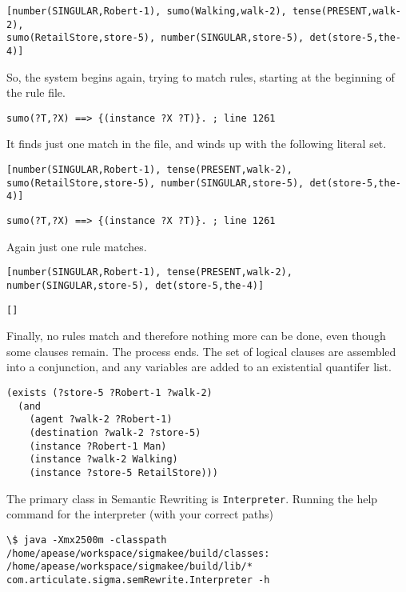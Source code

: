 \documentclass{book}
\begin{document}
\begin{verbatim}
[number(SINGULAR,Robert-1), sumo(Walking,walk-2), tense(PRESENT,walk-2), 
sumo(RetailStore,store-5), number(SINGULAR,store-5), det(store-5,the-4)]
\end{verbatim}

So, the system begins again, trying to match rules, starting at the 
beginning of the rule file.

\begin{verbatim}
sumo(?T,?X) ==> {(instance ?X ?T)}. ; line 1261
\end{verbatim}

It finds just one match in the file, and winds up with the following
literal set.

\begin{verbatim}
[number(SINGULAR,Robert-1), tense(PRESENT,walk-2), 
sumo(RetailStore,store-5), number(SINGULAR,store-5), det(store-5,the-4)]
\end{verbatim}

\begin{verbatim}
sumo(?T,?X) ==> {(instance ?X ?T)}. ; line 1261
\end{verbatim}

Again just one rule matches.

\begin{verbatim}
[number(SINGULAR,Robert-1), tense(PRESENT,walk-2), 
number(SINGULAR,store-5), det(store-5,the-4)]
\end{verbatim}

\begin{verbatim}
[]
\end{verbatim}

Finally, no rules match and therefore nothing more can be done, even 
though some clauses remain.  The process ends.  The set of logical
clauses are assembled into a conjunction, and any variables are added
to an existential quantifer list.

\begin{verbatim}
(exists (?store-5 ?Robert-1 ?walk-2) 
  (and 
    (agent ?walk-2 ?Robert-1)
    (destination ?walk-2 ?store-5)
    (instance ?Robert-1 Man)
    (instance ?walk-2 Walking)
    (instance ?store-5 RetailStore))) 
\end{verbatim}

The primary class in Semantic Rewriting is
\texttt{Interpreter}. Running the help command for
the interpreter (with your correct paths)

\begin{verbatim}
\$ java -Xmx2500m -classpath /home/apease/workspace/sigmakee/build/classes:
/home/apease/workspace/sigmakee/build/lib/*  
com.articulate.sigma.semRewrite.Interpreter -h
\end{verbatim}
\end{document}
